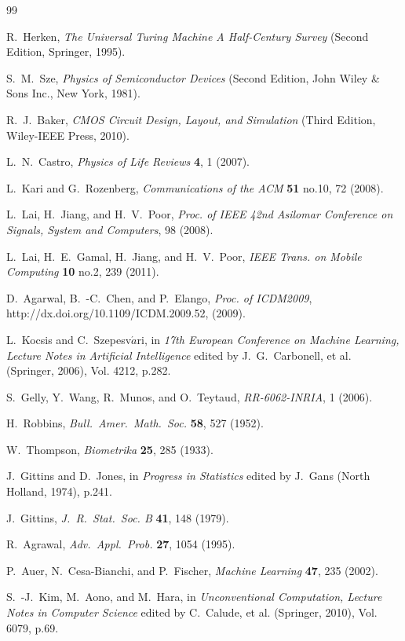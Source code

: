\documentclass[twocolumn,showpacs,preprintnumbers,amsmath,amssymb]{revtex4}
\begin{document}
\begin{thebibliography}{99}

R.~Herken, {\em The Universal Turing Machine A Half-Century Survey} (Second Edition, Springer, 1995).


S.~M.~Sze, {\em Physics of Semiconductor Devices} (Second Edition, John Wiley \& Sons Inc., New York, 1981).

R.~J.~Baker, {\em CMOS Circuit Design, Layout, and Simulation} (Third Edition, Wiley-IEEE Press, 2010).

L.~N.~Castro, {\em Physics of Life Reviews} {\bf 4}, 1 (2007).

L.~Kari and G.~Rozenberg, {\em Communications of the ACM} {\bf 51} no.10, 72 (2008).

L.~Lai, H.~Jiang, and H.~V.~Poor, {\em Proc. of IEEE 42nd Asilomar Conference on Signals, System and Computers}, 98 (2008).

L.~Lai, H.~E.~Gamal, H.~Jiang, and H.~V.~Poor, {\em IEEE Trans. on Mobile Computing} {\bf 10} no.2, 239 (2011).

D.~Agarwal, B.~-C.~Chen, and P.~Elango, {\em Proc. of ICDM2009}, http://dx.doi.org/10.1109/ICDM.2009.52, (2009).

L.~Kocsis and C.~Szepesv$\acute{a}$ri, in {\em 17th European Conference on Machine Learning, Lecture Notes in Artificial Intelligence} edited by J.~G.~Carbonell, et al. (Springer, 2006), Vol. 4212, p.282. 

S.~Gelly, Y.~Wang, R.~Munos, and O.~Teytaud, {\em RR-6062-INRIA}, 1 (2006).

H.~Robbins, {\em Bull.~Amer.~Math.~Soc.} {\bf 58}, 527 (1952).

W.~Thompson, {\em Biometrika} {\bf 25}, 285 (1933).

J.~Gittins and D.~Jones, in {\em Progress in Statistics} edited by J.~Gans (North Holland, 1974), p.241.

J.~Gittins, {\em J.~R.~Stat.~Soc. B} {\bf 41}, 148 (1979).

R.~Agrawal, {\em Adv.~Appl.~Prob.} {\bf 27}, 1054 (1995). 

P.~Auer, N.~Cesa-Bianchi, and P.~Fischer, {\em Machine Learning} {\bf 47}, 235 (2002).


S.~-J.~Kim, M.~Aono, and M.~Hara, in {\em Unconventional Computation, Lecture Notes in Computer Science} edited by C.~Calude, et al. (Springer, 2010), Vol. 6079, p.69.


\end{thebibliography}
\end{document}
